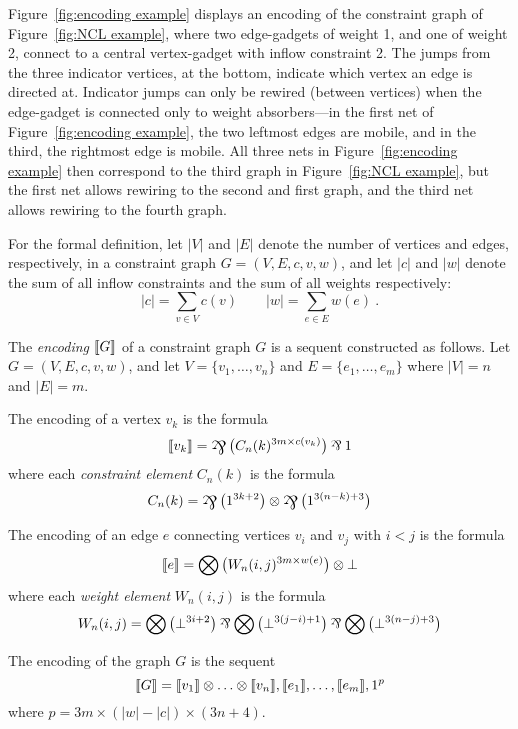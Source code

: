 \documentclass{sigplanconf}
\begin{document}
Figure~\ref{fig:encoding example} displays an encoding of the constraint graph of Figure~\ref{fig:NCL example}, where two edge-gadgets of weight 1, and one of weight 2, connect to a central vertex-gadget with inflow constraint 2.
%
The jumps from the three indicator vertices, at the bottom, indicate which vertex an edge is directed at.
%
Indicator jumps can only be rewired (between vertices) when the edge-gadget is connected only to weight absorbers---in the first net of Figure~\ref{fig:encoding example}, the two leftmost edges are mobile, and in the third, the rightmost edge is mobile.
%
All three nets in Figure~\ref{fig:encoding example} then correspond to the third graph in Figure~\ref{fig:NCL example}, but the first net allows rewiring to the second and first graph, and the third net allows rewiring to the fourth graph.
%
\color{black}


%
For the formal definition, let $|V|$ and $|E|$ denote the number of vertices and edges, respectively, in a constraint graph $G=(V,E,c,v,w)$, and let $|c|$ and $|w|$ denote the sum of all inflow constraints and the sum of all weights respectively:
\[
	|c| = \sum_{v\in V}c(v) \qquad |w| = \sum_{e\in E}w(e)~.
\]



\begin{definition}
\label{def:graph encoding}
The \emph{encoding} $\llbracket G\rrbracket$ of a constraint graph $G$ is a sequent constructed as follows.
%
Let $G=(V,E,c,v,w)$, and let $V=\{v_1,\dotsc,v_n\}$ and $E=\{e_1,\dotsc,e_m\}$ where $|V|=n$ and $|E|=m$.

\noindent
The encoding of a vertex $v_k$ is the formula
\[
	\itn{v_k} = \bigparr\big(C_n(k)^{3m\times c(v_k)} \big)\parr\1
\]
where each \emph{constraint element} $C_n(k)$ is the formula
\[
	C_n(k) = \bigparr\big(1^{3k+2}\big) \tn \bigparr\big(1^{3(n-k)+3}\big)
\]

\noindent
The encoding of an edge $e$ connecting vertices $v_i$ and $v_j$ with $i<j$ is the formula
\[
	\llbracket e\rrbracket = \bigotimes\big(W_n(i,j)^{3m\times w(e)}\big)\otimes\bot
\]
where each \emph{weight element} $W_n(i,j)$ is the formula
\[
	W_n(i,j) = \bigtn\big(\bot^{3i+2}\big)\parr\bigtn\big(\bot^{3(j-i)+1}\big)\parr\bigtn\big(\bot^{3(n-j)+3}\big)
\]

\noindent
The encoding of the graph $G$ is the sequent
\[
	\llbracket G\rrbracket = \llbracket v_1\rrbracket\otimes\dotso\otimes\llbracket v_n\rrbracket, \llbracket e_1\rrbracket,\dotsc,\llbracket e_m\rrbracket, 1^p
\]
where $p=3m\times(|w|-|c|)\times(3n+4)$.

\end{definition}
\end{document}
